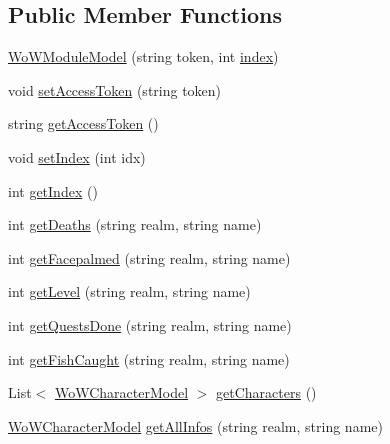 \subsection*{Public Member Functions}
\begin{DoxyCompactItemize}
\item 
\mbox{\hyperlink{classArea_1_1Models_1_1WoWModuleModel_a515697f205e3c05e96e5cacc95c16800}{Wo\+W\+Module\+Model}} (string token, int \mbox{\hyperlink{classArea_1_1Models_1_1WoWModuleModel_aac650af907ed739ace201b3b5d616bb7}{index}})
\item 
void \mbox{\hyperlink{classArea_1_1Models_1_1WoWModuleModel_a7f03216eb89034c3097b540a26addb0a}{set\+Access\+Token}} (string token)
\item 
string \mbox{\hyperlink{classArea_1_1Models_1_1WoWModuleModel_a6610d851f47e22d7b7c3a379613ffa8f}{get\+Access\+Token}} ()
\item 
void \mbox{\hyperlink{classArea_1_1Models_1_1WoWModuleModel_aa61b3bbefb103d8ab29e904746903ffc}{set\+Index}} (int idx)
\item 
int \mbox{\hyperlink{classArea_1_1Models_1_1WoWModuleModel_a30fec7fe49970aa15353e165c70595c8}{get\+Index}} ()
\item 
int \mbox{\hyperlink{classArea_1_1Models_1_1WoWModuleModel_a5290aa1a5920a181d776c1141e61e6fb}{get\+Deaths}} (string realm, string name)
\item 
int \mbox{\hyperlink{classArea_1_1Models_1_1WoWModuleModel_a693db2f43310edc63c5a99699cce3c23}{get\+Facepalmed}} (string realm, string name)
\item 
int \mbox{\hyperlink{classArea_1_1Models_1_1WoWModuleModel_af0374d1e82b3ba9629f2650f53f59499}{get\+Level}} (string realm, string name)
\item 
int \mbox{\hyperlink{classArea_1_1Models_1_1WoWModuleModel_a865cb3b6f7f3813b023b16a910058289}{get\+Quests\+Done}} (string realm, string name)
\item 
int \mbox{\hyperlink{classArea_1_1Models_1_1WoWModuleModel_aaa1e7b11adc37c085ad229144def8276}{get\+Fish\+Caught}} (string realm, string name)
\item 
List$<$ \mbox{\hyperlink{classArea_1_1Models_1_1WoWCharacterModel}{Wo\+W\+Character\+Model}} $>$ \mbox{\hyperlink{classArea_1_1Models_1_1WoWModuleModel_a5b0f580381e294a2780280f977df3c82}{get\+Characters}} ()
\item 
\mbox{\hyperlink{classArea_1_1Models_1_1WoWCharacterModel}{Wo\+W\+Character\+Model}} \mbox{\hyperlink{classArea_1_1Models_1_1WoWModuleModel_a84837c4b1596b77f20e2c5c8bf7ea175}{get\+All\+Infos}} (string realm, string name)

\end{DoxyCompactItemize}
